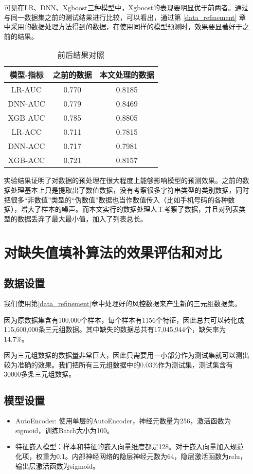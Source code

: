 可见在LR、DNN、Xgboost三种模型中，Xgboost的表现要明显优于前两者。通过与同一数据集之前的测试结果\cite{czh}进行比较，可以看出，通过第 \ref{data_refinement} 章中采用的数据处理方法得到的数据，在使用同样的模型预测时，效果要显著好于之前的结果。

\begin{table}[htb]
\centering\small
\caption{前后结果对照}
    \begin{tabular}{ccc}
        \toprule
        模型-指标  & 之前的数据 & 本文处理的数据 \\
        \midrule
        LR-AUC  & 0.770  & 0.8185 \\
        DNN-AUC & 0.779  & 0.8469 \\
        XGB-AUC & 0.785  & 0.8805 \\
        LR-ACC & 0.711  & 0.7815 \\
        DNN-ACC & 0.717  & 0.7981 \\
        XGB-ACC & 0.721  & 0.8157 \\
        \bottomrule
    \end{tabular}
\end{table}

实验结果证明了对数据的预处理在很大程度上能够影响模型的预测效果。之前的数据处理基本上只是提取出了数值数据，没有考察很多字符串类型的类别数据，同时把很多“非数值”类型的“伪数值”数据也当作数值传入（比如手机号码的各种数据），增大了样本的噪声。而本文实行的数据处理人工考察了数据，并且对列表类型的数据丢弃了最大最小值，加入了列表总长。


\section{对缺失值填补算法的效果评估和对比}
\subsection{数据设置}
我们使用第\ref{data_refinement}章中处理好的风控数据来产生新的三元组数据集。

因为原数据集含有100,000个样本，每个样本有1156个特征，因此总共可以转化成115,600,000条三元组数据。其中缺失的数据总共有17,045,944个，缺失率为14.7\%。

因为三元组数据的数据量非常巨大，因此只需要用一小部分作为测试集就可以测出较为准确的效果。我们把所有三元组数据中的0.03\%作为测试集，测试集含有30000多条三元组数据。

\subsection{模型设置}
\begin{itemize}
    \item AutoEncoder:  使用单层的AutoEncoder，神经元数量为256，激活函数为sigmoid，训练Batch大小为100。
    \item 特征嵌入模型：样本和特征的嵌入向量维度都是128。对于嵌入向量加入规范化项，权重为0.1。内部神经网络的隐层神经元数为64，隐层激活函数为relu，输出层激活函数为sigmoid。
\end{itemize}

